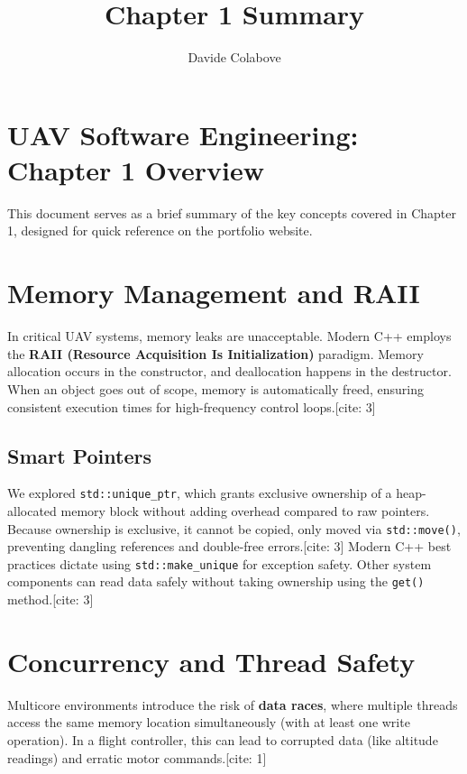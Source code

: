 \documentclass{article}
\title{Chapter 1 Summary}
\author{Davide Colabove}
\date{}
\begin{document}
\maketitle

\section*{UAV Software Engineering: Chapter 1 Overview}
This document serves as a brief summary of the key concepts covered in Chapter 1, designed for quick reference on the portfolio website.

\section{Memory Management and RAII}
In critical UAV systems, memory leaks are unacceptable. Modern C++ employs the \textbf{RAII (Resource Acquisition Is Initialization)} paradigm. Memory allocation occurs in the constructor, and deallocation happens in the destructor. When an object goes out of scope, memory is automatically freed, ensuring consistent execution times for high-frequency control loops.[cite: 3]

\subsection*{Smart Pointers}
We explored \texttt{std::unique\_ptr}, which grants exclusive ownership of a heap-allocated memory block without adding overhead compared to raw pointers. Because ownership is exclusive, it cannot be copied, only moved via \texttt{std::move()}, preventing dangling references and double-free errors.[cite: 3] 
Modern C++ best practices dictate using \texttt{std::make\_unique} for exception safety. Other system components can read data safely without taking ownership using the \texttt{get()} method.[cite: 3]

\section{Concurrency and Thread Safety}
Multicore environments introduce the risk of \textbf{data races}, where multiple threads access the same memory location simultaneously (with at least one write operation). In a flight controller, this can lead to corrupted data (like altitude readings) and erratic motor commands.[cite: 1]
\end{document}
